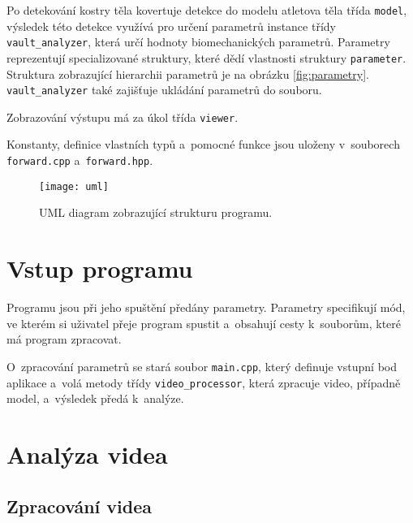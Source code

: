 Po detekování kostry těla kovertuje detekce do modelu atletova těla třída \texttt{model}, výsledek této detekce využívá pro určení parametrů instance třídy \texttt{vault\_analyzer}, která určí hodnoty biomechanických parametrů. Parametry reprezentují specializované struktury, které dědí vlastnosti struktury \texttt{parameter}. Struktura zobrazující hierarchii parametrů je na obrázku \ref{fig:parametry}. \texttt{vault\_analyzer} také zajišťuje ukládání parametrů do souboru.

Zobrazování výstupu má za úkol třída \texttt{viewer}.

Konstanty, definice vlastních typů a~pomocné funkce jsou uloženy v~souborech \texttt{forward.cpp} a~\texttt{forward.hpp}.

\begin{figure}[h]\centering
    \texttt{[image: uml]}
    \caption{UML diagram zobrazující strukturu programu.}
    \label{fig:uml_schema}
\end{figure}






\section{Vstup programu}

Programu jsou při jeho spuštění předány parametry. Parametry specifikují mód, ve kterém si uživatel přeje program spustit a~obsahují cesty k~souborům, které má program zpracovat.

O~zpracování parametrů se stará soubor \texttt{main.cpp}, který definuje vstupní bod aplikace a~volá metody třídy \texttt{video\_processor}, která zpracuje video, případně model, a~výsledek předá k~analýze.




\section{Analýza videa}

\subsection{Zpracování videa}

